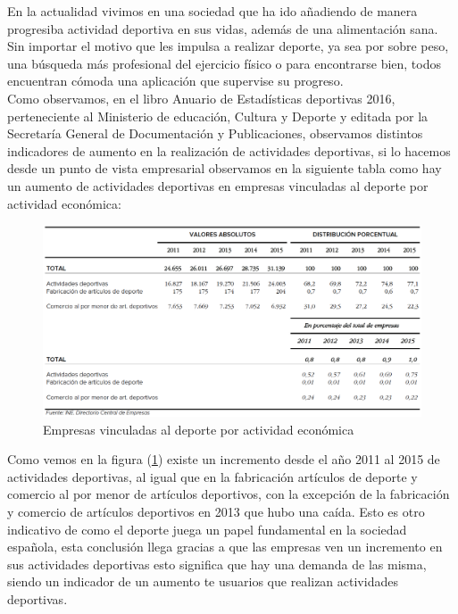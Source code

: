 \documentclass[a4paper, 11pt]{article}
\begin{document}

      En la actualidad vivimos en una sociedad que ha ido añadiendo de manera
      progresiba actividad deportiva en sus vidas, además de una alimentación sana. Sin
      importar el motivo que les impulsa a realizar deporte, ya sea por sobre
      peso, una búsqueda más profesional del ejercicio físico o para encontrarse
      bien, todos encuentran cómoda una aplicación que supervise su progreso. \\

      Como observamos, en el libro Anuario de Estadísticas deportivas 2016,
      perteneciente al Ministerio de educación, Cultura y Deporte y editada por
      la Secretaría General de Documentación y Publicaciones, observamos
      distintos indicadores de aumento en la realización de actividades
      deportivas, si lo hacemos desde un punto de vista empresarial observamos
      en la siguiente tabla como hay un aumento de actividades deportivas en
      empresas vinculadas al deporte por actividad económica:\\

      \begin{figure}[H]
          \centering
          \includegraphics[width=1\textwidth]{empresas-vinculadas-al-deporte-por-actividad-economica}
          \caption{Empresas vinculadas al deporte por actividad económica}
          \label{f:empresas}
      \end{figure}

      Como vemos en la figura (\ref{f:empresas}) existe un incremento desde el
      año 2011 al 2015 de actividades deportivas, al igual que en la fabricación
      artículos de deporte y comercio al por menor de artículos deportivos,
      con la excepción de la fabricación y comercio de artículos deportivos en
      2013 que hubo una caída. Esto es otro indicativo de como el deporte juega
      un papel fundamental en la sociedad española, esta conclusión llega
      gracias a que las empresas ven un incremento en sus actividades deportivas
      esto significa que hay una demanda de las misma, siendo un indicador de
      un aumento te usuarios que realizan actividades deportivas.\\
\end{document}
